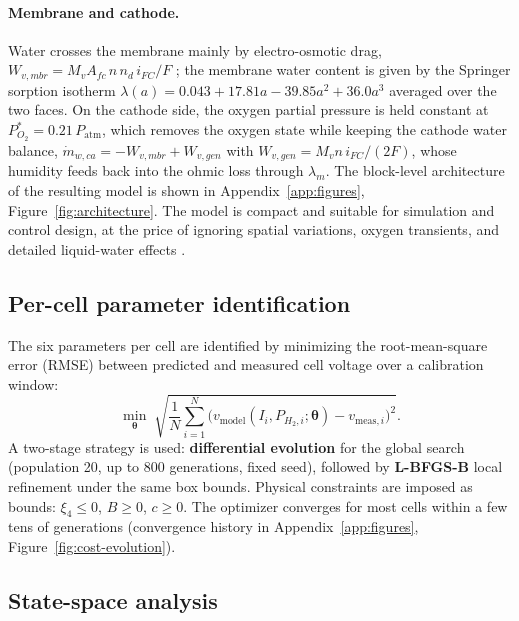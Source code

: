 \documentclass[11pt,a4paper]{article}
\begin{document}
\paragraph{Membrane and cathode.}
Water crosses the membrane mainly by electro-osmotic drag,
$W_{v,mbr}=M_v A_{fc}\,n\,n_d\,i_{FC}/F$ \cite{pukrushpan2003}; the membrane water
content is given by the Springer sorption isotherm
$\lambda(a)=0.043+17.81a-39.85a^2+36.0a^3$ averaged over the two faces. On the
cathode side, the oxygen partial pressure is held constant at
$P_{O_2}^{\ast}=0.21\,P_{\mathrm{atm}}$, which removes the oxygen state while
keeping the cathode water balance,
$\dot{m}_{w,ca}=-W_{v,mbr}+W_{v,gen}$ with $W_{v,gen}=M_v n\,i_{FC}/(2F)$,
whose humidity feeds back into the ohmic loss through $\lambda_m$. The
block-level architecture of the resulting model is shown in
Appendix~\ref{app:figures}, Figure~\ref{fig:architecture}. The model is compact
and suitable for simulation and control design, at the price of ignoring spatial
variations, oxygen transients, and detailed liquid-water effects
\cite{weber2004,zhang2017}.

\subsection{Per-cell parameter identification}
\label{sec:identification}

The six parameters per cell are identified by minimizing the root-mean-square
error (RMSE) between predicted and measured cell voltage over a calibration window:
\begin{equation}
    \min_{\boldsymbol{\theta}}\;
    \sqrt{\frac{1}{N}\sum_{i=1}^{N}
        \bigl(v_{\text{model}}(I_i,P_{H_2,i};\boldsymbol{\theta})-v_{\text{meas},i}\bigr)^2}.
    \label{eq:rmse}
\end{equation}
A two-stage strategy is used: \textbf{differential evolution} for the global
search (population 20, up to 800 generations, fixed seed), followed by
\textbf{L-BFGS-B} local refinement under the same box bounds. Physical constraints
are imposed as bounds: $\xi_4\le 0$, $B\ge 0$, $c\ge 0$. The optimizer converges
for most cells within a few tens of generations (convergence history in
Appendix~\ref{app:figures}, Figure~\ref{fig:cost-evolution}).

\subsection{State-space analysis}
\label{sec:ss-method}
\end{document}
